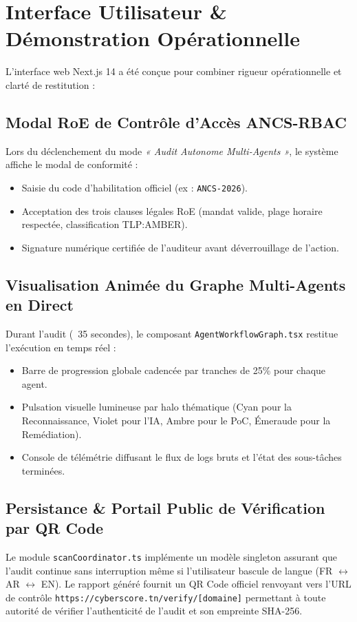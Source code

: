 \documentclass[11pt,a4paper,oneside]{article}
\begin{document}
\section{Interface Utilisateur \& Démonstration Opérationnelle}

L'interface web Next.js 14 a été conçue pour combiner rigueur opérationnelle et clarté de restitution :

\subsection{Modal RoE de Contrôle d'Accès ANCS-RBAC}
Lors du déclenchement du mode \textit{« Audit Autonome Multi-Agents »}, le système affiche le modal de conformité :
\begin{itemize}
    \item Saisie du code d'habilitation officiel (ex : \texttt{ANCS-2026}).
    \item Acceptation des trois clauses légales RoE (mandat valide, plage horaire respectée, classification TLP:AMBER).
    \item Signature numérique certifiée de l'auditeur avant déverrouillage de l'action.
\end{itemize}

\subsection{Visualisation Animée du Graphe Multi-Agents en Direct}
Durant l'audit (~35 secondes), le composant \texttt{AgentWorkflowGraph.tsx} restitue l'exécution en temps réel :
\begin{itemize}
    \item Barre de progression globale cadencée par tranches de 25\% pour chaque agent.
    \item Pulsation visuelle lumineuse par halo thématique (Cyan pour la Reconnaissance, Violet pour l'IA, Ambre pour le PoC, Émeraude pour la Remédiation).
    \item Console de télémétrie diffusant le flux de logs bruts et l'état des sous-tâches terminées.
\end{itemize}

\subsection{Persistance \& Portail Public de Vérification par QR Code}
Le module \texttt{scanCoordinator.ts} implémente un modèle singleton assurant que l'audit continue sans interruption même si l'utilisateur bascule de langue (FR $\leftrightarrow$ AR $\leftrightarrow$ EN). Le rapport généré fournit un QR Code officiel renvoyant vers l'URL de contrôle \texttt{https://cyberscore.tn/verify/[domaine]} permettant à toute autorité de vérifier l'authenticité de l'audit et son empreinte SHA-256.
\end{document}
